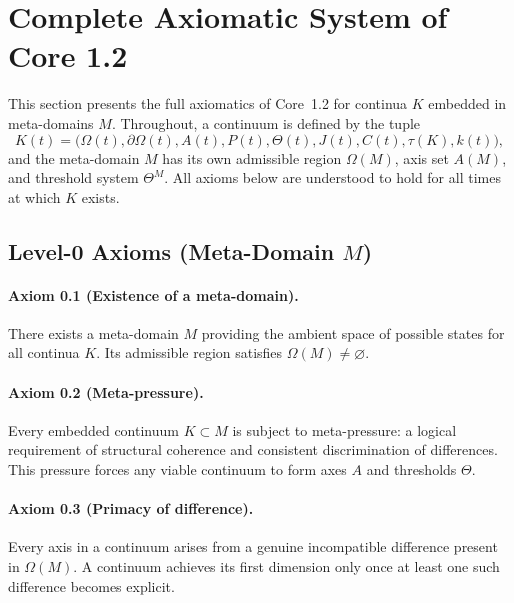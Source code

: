 \section{Complete Axiomatic System of Core 1.2}
\label{sec:axioms-full}

This section presents the full axiomatics of Core~1.2 for continua \(K\) embedded in meta-domains \(M\).
Throughout, a continuum is defined by the tuple
\[
  K(t) = \bigl(\Omega(t),\partial\Omega(t),A(t),P(t),\Theta(t),J(t),C(t),\tau(K),k(t)\bigr),
\]
and the meta-domain \(M\) has its own admissible region \(\Omega(M)\), axis set \(A(M)\), and threshold system \(\Theta^M\).
All axioms below are understood to hold for all times at which \(K\) exists.

\subsection{Level-0 Axioms (Meta-Domain \texorpdfstring{\(M\)}{M})}

\paragraph{Axiom 0.1 (Existence of a meta-domain).}
There exists a meta-domain \(M\) providing the ambient space of possible states for all continua \(K\).
Its admissible region satisfies \(\Omega(M)\neq \varnothing\).

\paragraph{Axiom 0.2 (Meta-pressure).}
Every embedded continuum \(K\subset M\) is subject to meta-pressure: a logical requirement of structural coherence and consistent discrimination of differences.
This pressure forces any viable continuum to form axes \(A\) and thresholds \(\Theta\).

\paragraph{Axiom 0.3 (Primacy of difference).}
Every axis in a continuum arises from a genuine incompatible difference present in \(\Omega(M)\).
A continuum achieves its first dimension only once at least one such difference becomes explicit.

